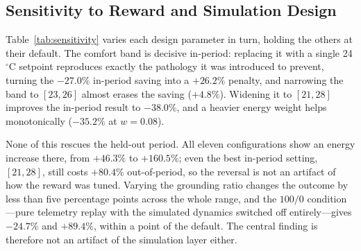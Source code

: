 \documentclass[conference]{IEEEtran}
\begin{document}
\subsection{Sensitivity to Reward and Simulation Design}
\label{sec:sensitivity}
Table~\ref{tab:sensitivity} varies each design parameter in turn, holding the
others at their default. The comfort band is decisive in-period: replacing it
with a single 24\,$^{\circ}$C setpoint reproduces exactly the pathology it was
introduced to prevent, turning the $-27.0\%$ in-period saving into a $+26.2\%$
penalty, and narrowing the band to $[23,26]$ almost erases the saving ($+4.8\%$).
Widening it to $[21,28]$ improves the in-period result to $-38.0\%$, and a
heavier energy weight helps monotonically ($-35.2\%$ at $w=0.08$).

None of this rescues the held-out period. All eleven configurations show an
energy increase there, from $+46.3\%$ to $+160.5\%$; even the best in-period
setting, $[21,28]$, still costs $+80.4\%$ out-of-period, so the reversal is not
an artifact of how the reward was tuned. Varying the grounding ratio changes the
outcome by less than five percentage points across the whole range, and the
$100/0$ condition---pure telemetry replay with the simulated dynamics switched
off entirely---gives $-24.7\%$ and $+89.4\%$, within a point of the default. The
central finding is therefore not an artifact of the simulation layer either.
\end{document}
